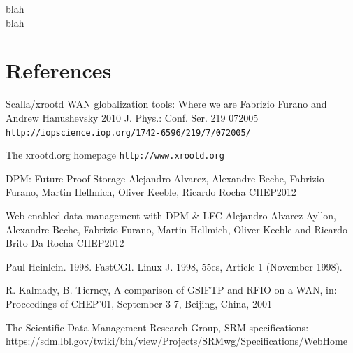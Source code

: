\documentclass[a4paper]{jpconf}
\begin{document}
blah\\
blah\\

\section*{References}
\begin{thebibliography}{9}

 Scalla/xrootd WAN globalization tools: Where we are
Fabrizio Furano and Andrew Hanushevsky 2010 J. Phys.: Conf. Ser. 219 072005
\verb"http://iopscience.iop.org/1742-6596/219/7/072005/"

 The xrootd.org homepage
\verb"http://www.xrootd.org"

 DPM: Future Proof Storage
Alejandro Alvarez, Alexandre Beche, Fabrizio Furano, Martin Hellmich, Oliver Keeble, Ricardo Rocha
CHEP2012

 Web enabled data management with DPM \& LFC
Alejandro Alvarez Ayllon, Alexandre Beche, Fabrizio Furano, Martin Hellmich, Oliver Keeble and Ricardo Brito Da Rocha
CHEP2012

 Paul Heinlein. 1998. FastCGI. Linux J. 1998, 55es, Article 1 (November 1998).

 R. Kalmady, B. Tierney, A comparison of GSIFTP and RFIO on a WAN, in: Proceedings of CHEP'01, September 3-7, Beijing, China, 2001

 The Scientific Data Management Research Group, SRM specifications: https://sdm.lbl.gov/twiki/bin/view/Projects/SRMwg/Specifications/WebHome

\end{thebibliography}
\end{document}

